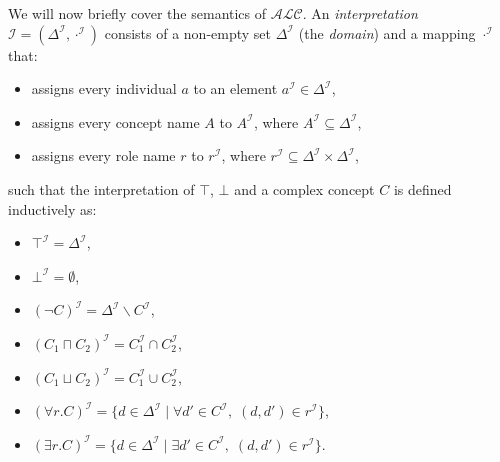 We will now briefly cover the semantics of $\mathcal{ALC}$. An \emph{interpretation} $\mathcal{I} = (\Delta^{\mathcal{I}}, \cdot^{\mathcal{I}})$ consists of a non-empty set $\Delta^{\mathcal{I}}$ (the \emph{domain}) and a mapping $\cdot^{\mathcal{I}}$ that:
\begin{itemize}
    \item assigns every individual $a$ to an element $a^{\mathcal{I}}\in \Delta^{\mathcal{I}}$,
    \item assigns every concept name $A$ to $A^{\mathcal{I}}$, where $A^{\mathcal{I}}\subseteq \Delta^{\mathcal{I}}$,
    \item assigns every role name $r$ to  $r^{\mathcal{I}}$, where $r^{\mathcal{I}}\subseteq \Delta^{\mathcal{I}}\times \Delta^{\mathcal{I}}$,
\end{itemize}

such that the interpretation of $\top$, $\bot$ and a complex concept $C$ is defined inductively as:
\begin{itemize}
    \item $ \top^{\mathcal{I}} = \Delta^{\mathcal{I}} $,
    \item $ \bot^{\mathcal{I}} = \emptyset $,
    \item $(\neg C)^{\mathcal{I}} = \Delta^{\mathcal{I}} \backslash C^{\mathcal{I}} $,
    \item $ (C_{1} \sqcap C_{2})^{\mathcal{I}} = C_{1}^{\mathcal{I}} \cap C_{2}^{\mathcal{I}} $,
    \item $ (C_{1} \sqcup C_{2})^{\mathcal{I}} = C_{1}^{\mathcal{I}} \cup C_{2}^{\mathcal{I}} $,
    \item $ (\forall r.C)^{\mathcal{I}} = \{d\in \Delta ^{\mathcal{I}}\;|\; \forall d' \in C^{\mathcal{I}}, \; (d,d')\in r^{\mathcal{I}}\} $,
    \item $ (\exists r.C)^{\mathcal{I}} = \{d\in \Delta ^{\mathcal{I}}\;|\; \exists d' \in C^{\mathcal{I}}, \; (d,d')\in r^{\mathcal{I}}\} $.
\end{itemize}


